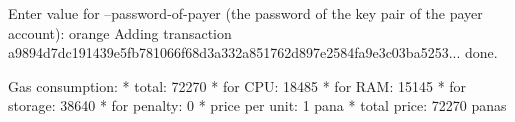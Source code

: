 \begin{shellbox}\begin{ttlst}
Enter value for --password-of-payer (the password of the key pair of the payer account): orange
Adding transaction a9894d7dc191439e5fb781066f68d3a332a851762d897e2584fa9e3c03ba5253... done.

Gas consumption:
 * total: 72270
   * for CPU: 18485
   * for RAM: 15145
   * for storage: 38640
   * for penalty: 0
 * price per unit: 1 pana
 * total price: 72270 panas
\end{ttlst}\end{shellbox}
